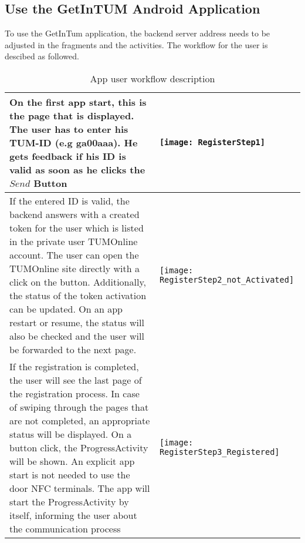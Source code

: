 \subsection{Use the GetInTUM Android Application}

To use the GetInTum application, the backend server address needs to be adjusted in the fragments and the activities.
The workflow for the user is descibed as followed.  

\begin{table}[ht]
\caption{App user workflow description}
\centering
\begin{tabular}{*{2}{m{}}}
\hline
On the first app start, this is the page
that is displayed. The user has to enter his TUM-ID (e.g ga00aaa).
He gets feedback if his ID is valid as soon as he clicks the $Send$ Button
&\texttt{[image: RegisterStep1]}\\
\hline
If the entered ID is valid, the backend answers with a created token for
the user which is listed in the private user TUMOnline account.
The user can open the TUMOnline site directly with a click on the button.
Additionally, the status of the token activation can be updated. On an app restart or resume, the status will also be checked and the user will be forwarded to the next page.
&\texttt{[image: RegisterStep2\_not\_Activated]}\\
\hline
If the registration is completed, the user will see the last page of the registration process.
In case of swiping through the pages that are not completed, an appropriate status will be displayed. On a button click, the ProgressActivity will be shown.
An explicit app start is not needed to use the door NFC terminals. The app will start the
ProgressActivity by itself, informing the user about the communication process
&\texttt{[image: RegisterStep3\_Registered]}\\

\end{tabular}
\label{tab:gt}
\end{table}

